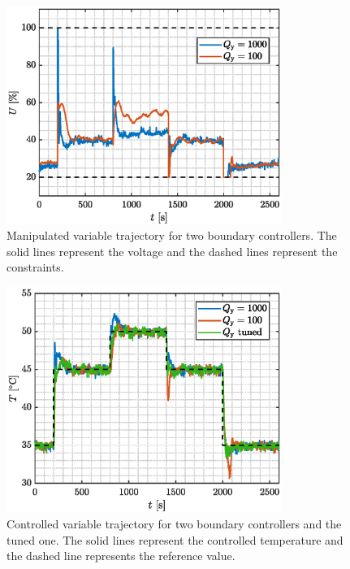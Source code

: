 \documentclass[preprint,12pt]{elsarticle}
\begin{document}
\begin{figure}
	\begin{center}
		\includegraphics[width=0.8\textwidth]{images/MV_boundaries}
		\caption{Manipulated variable trajectory for two boundary controllers. The solid lines represent the voltage and the dashed lines represent the constraints.}
		\label{fig:MV_boundaries}
	\end{center}
\end{figure}

\begin{figure}
	\begin{center}
		\includegraphics[width=0.8\textwidth]{images/CV}
		\caption{Controlled variable trajectory for two boundary controllers and the tuned one. The solid lines represent the controlled temperature and the dashed line represents the reference value.}
		\label{fig:CV}
	\end{center}
\end{figure}
\end{document}
